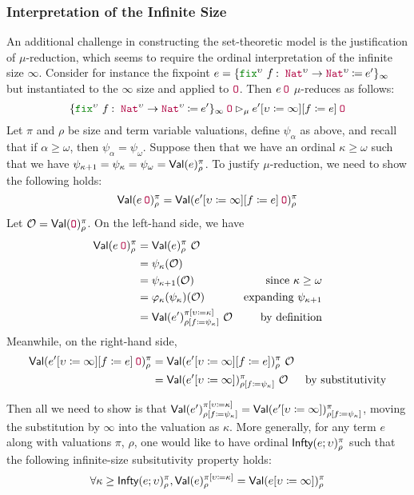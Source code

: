 \iffalse
\subsubsection{Interpretation of the Infinite Size}

An additional challenge in constructing the set-theoretic model is
the justification of $\mu$-reduction, which seems to require
the ordinal interpretation of the infinite size $\infty$.
Consider for instance the fixpoint
$e = \fixE{\upsilon}{f}{\Nat^\upsilon \rightarrow \Nat^\upsilon}{e'}{\infty}$
but instantiated to the $\infty$ size and applied to $\Zero$.
Then $\app{e}{\Zero}$ $\mu$-reduces as follows:
$$\app{\fixE{\upsilon}{f}{\Nat^\upsilon \rightarrow \Nat^\upsilon}{e'}{\infty}}{\Zero}
\rhd_\mu
\app{\subst{\subst{e'}{\upsilon}{\infty}}{f}{e}}{\Zero}$$
Let $\pi$ and $\rho$ be size and term variable valuations,
define $\psi_\alpha$ as above, and recall that if $\alpha \geq \omega$,
then $\psi_\alpha = \psi_\omega$.
Suppose then that we have an ordinal $\kappa \geq \omega$ such that we have
$\psi_{\kappa+1} = \psi_\kappa = \psi_\omega = \textsf{Val}(e)_\rho^\pi$.
To justify $\mu$-reduction, we need to show the following holds:
$$\Val(\app{e}{\Zero})_\rho^\pi = \Val(\app{\subst{\subst{e'}{\upsilon}{\infty}}{f}{e}}{\Zero})_\rho^\pi$$
Let $\mathcal{O} = \Val(\Zero)_\rho^\pi$.
On the left-hand side, we have
\begin{align*}
  \Val(\app{e}{\Zero})_\rho^\pi &= \Val(e)_\rho^\pi ~ \mathcal{O} \\
  &= \psi_{\kappa}(\mathcal{O}) \\
  &= \psi_{\kappa+1}(\mathcal{O}) &\text{since $\kappa \geq \omega$} \\
  &= \phi_\kappa(\psi_\kappa)(\mathcal{O}) &\text{expanding $\psi_{\kappa+1}$} \\
  &= \Val(e')_{\subst{\rho}{f}{\psi_\kappa}}^{\subst{\pi}{\upsilon}{\kappa}} ~ \mathcal{O} &\text{by definition}
\end{align*}
Meanwhile, on the right-hand side,
\begin{align*}
  \Val(\app{\subst{\subst{e'}{\upsilon}{\infty}}{f}{e}}{\Zero})_\rho^\pi
  &= \Val(\subst{\subst{e'}{\upsilon}{\infty}}{f}{e})_\rho^\pi ~ \mathcal{O} \\
  &= \Val(\subst{e'}{\upsilon}{\infty})_{\subst{\rho}{f}{\psi_\kappa}}^\pi ~ \mathcal{O} &\text{by substitutivity}
\end{align*}

Then all we need to show is that
$\textsf{Val}(e')_{\rho [f \coloneqq \psi_\kappa]}^{\pi [\upsilon \coloneqq \kappa]}
= \textsf{Val}(e' [\upsilon \coloneqq \infty])_{\rho [f \coloneqq \psi_\kappa]}^\pi$,
moving the substitution by $\infty$ into the valuation as $\kappa$.
More generally, for any term $e$ along with valuations $\pi$, $\rho$,
one would like to have ordinal $\textsf{Infty}(e; \upsilon)_\rho^\pi$ such that the
following infinite-size subsitutivity property holds:
$$\forall \kappa \geq \textsf{Infty}(e; \upsilon)_\rho^\pi,
  \textsf{Val}(e)_{\rho}^{\pi [\upsilon \coloneqq \kappa]}
  = \textsf{Val}(e [\upsilon \coloneqq \infty])_{\rho}^{\pi}$$

